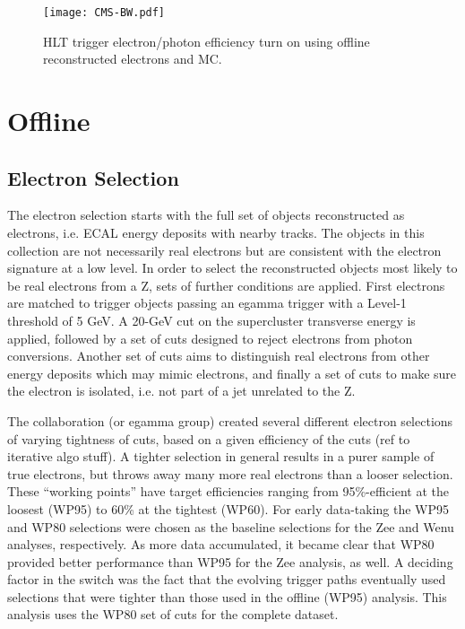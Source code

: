  \begin{figure}[htb]
  \begin{center}
    \texttt{[image: CMS-BW.pdf]}
  \end{center}
  \caption[HLT trigger electron/photon efficiency turn on using offline reconstructed electrons and MC]{HLT trigger electron/photon efficiency turn on using offline reconstructed electrons and MC.}
  \label{fig:HLTriggerObjectEfficiencies}
 \end{figure}



\clearpage
\section{Offline}
\subsection{Electron Selection}
The electron selection starts with the full set of objects reconstructed as electrons, 
i.e. ECAL energy deposits with nearby tracks.  
The objects in this collection are not necessarily real electrons 
but are consistent with the electron signature at a low level.  
In order to select the reconstructed objects most likely to be real electrons from a Z, 
sets of further conditions are applied.  
First electrons are matched to trigger objects passing an egamma trigger with a Level-1 threshold of 5 GeV.  
A 20-GeV cut on the supercluster transverse energy is applied,
followed by a set of cuts designed to reject electrons from photon conversions.  
Another set of cuts aims to distinguish real electrons from other energy deposits which may mimic electrons, 
and finally a set of cuts to make sure the electron is isolated, i.e. not part of a jet unrelated to the Z.  

The collaboration (or egamma group) created several different electron selections of varying tightness of cuts,
based on a given efficiency of the cuts (ref to iterative algo stuff).  
A tighter selection in general results in a purer sample of true electrons, but throws away many more
real electrons than a looser selection.  
These ``working points'' have target efficiencies ranging from 95\%-efficient at the loosest (WP95) to 60\% at the tightest (WP60).  
For early data-taking the WP95 and WP80 selections were chosen as the baseline selections for the Zee and Wenu analyses, respectively.
As more data accumulated, it became clear that WP80 provided better performance than WP95 for the Zee analysis, as well.  
A deciding factor in the switch was the fact that the evolving trigger paths eventually used selections that were
tighter than those used in the offline (WP95) analysis.  
This analysis uses the WP80 set of cuts for the complete dataset.  

